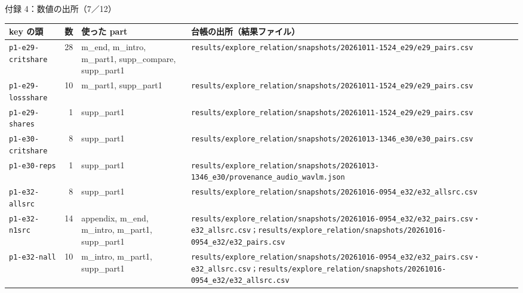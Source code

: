 \begin{frame}{付録 4：数値の出所（7／12）}
  \vspace{-0.3em}\centering\tiny\renewcommand{\arraystretch}{1.0}
  \begin{tabularx}{\textwidth}{@{}l r l X@{}}
    \toprule key の頭 & 数 & 使った part & 台帳の出所（結果ファイル） \\ \midrule
    \texttt{p1-e29-critshare} & 28 & m\_end, m\_intro, m\_part1, supp\_compare, supp\_part1 & \texttt{results/\allowbreak{}explore\_\allowbreak{}relation/\allowbreak{}snapshots/\allowbreak{}20261011-1524\_\allowbreak{}e29/\allowbreak{}e29\_\allowbreak{}pairs.csv} \\
    \texttt{p1-e29-lossshare} & 10 & m\_part1, supp\_part1 & \texttt{results/\allowbreak{}explore\_\allowbreak{}relation/\allowbreak{}snapshots/\allowbreak{}20261011-1524\_\allowbreak{}e29/\allowbreak{}e29\_\allowbreak{}pairs.csv} \\
    \texttt{p1-e29-shares} & 1 & supp\_part1 & \texttt{results/\allowbreak{}explore\_\allowbreak{}relation/\allowbreak{}snapshots/\allowbreak{}20261011-1524\_\allowbreak{}e29/\allowbreak{}e29\_\allowbreak{}pairs.csv} \\
    \texttt{p1-e30-critshare} & 8 & supp\_part1 & \texttt{results/\allowbreak{}explore\_\allowbreak{}relation/\allowbreak{}snapshots/\allowbreak{}20261013-1346\_\allowbreak{}e30/\allowbreak{}e30\_\allowbreak{}pairs.csv} \\
    \texttt{p1-e30-reps} & 1 & supp\_part1 & \texttt{results/\allowbreak{}explore\_\allowbreak{}relation/\allowbreak{}snapshots/\allowbreak{}20261013-1346\_\allowbreak{}e30/\allowbreak{}provenance\_\allowbreak{}audio\_\allowbreak{}wavlm.json} \\
    \texttt{p1-e32-allsrc} & 8 & supp\_part1 & \texttt{results/\allowbreak{}explore\_\allowbreak{}relation/\allowbreak{}snapshots/\allowbreak{}20261016-0954\_\allowbreak{}e32/\allowbreak{}e32\_\allowbreak{}allsrc.csv} \\
    \texttt{p1-e32-n1src} & 14 & appendix, m\_end, m\_intro, m\_part1, supp\_part1 & \texttt{results/\allowbreak{}explore\_\allowbreak{}relation/\allowbreak{}snapshots/\allowbreak{}20261016-0954\_\allowbreak{}e32/\allowbreak{}e32\_\allowbreak{}pairs.csv・e32\_\allowbreak{}allsrc.csv；results/\allowbreak{}explore\_\allowbreak{}relation/\allowbreak{}snapshots/\allowbreak{}20261016-0954\_\allowbreak{}e32/\allowbreak{}e32\_\allowbreak{}pairs.csv} \\
    \texttt{p1-e32-nall} & 10 & m\_intro, m\_part1, supp\_part1 & \texttt{results/\allowbreak{}explore\_\allowbreak{}relation/\allowbreak{}snapshots/\allowbreak{}20261016-0954\_\allowbreak{}e32/\allowbreak{}e32\_\allowbreak{}pairs.csv・e32\_\allowbreak{}allsrc.csv；results/\allowbreak{}explore\_\allowbreak{}relation/\allowbreak{}snapshots/\allowbreak{}20261016-0954\_\allowbreak{}e32/\allowbreak{}e32\_\allowbreak{}allsrc.csv} \\

\end{tabularx}
\end{frame}
